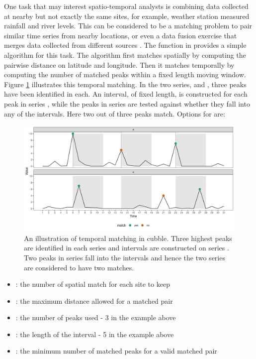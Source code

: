 \documentclass[
]{jss}
\providecommand{\tightlist}{%
  \setlength{\itemsep}{0pt}\setlength{\parskip}{0pt}}
\begin{document}
One task that may interest spatio-temporal analysts is combining data collected at nearby but not exactly the same sites, for example, weather station measured rainfall and river levels. This can be considered to be a matching problem \citep{stuart2010matching, mcintosh2018using} to pair similar time series from nearby locations, or even a data fusion exercise that merges data collected from different sources \citep{cocchi2019data}. The function  in  provides a simple algorithm for this task. The algorithm first matches spatially by computing the pairwise distance on latitude and longitude. Then it matches temporally by computing the number of matched peaks within a fixed length moving window. Figure \ref{fig:illu-matching} illustrates this temporal matching. In the two series,  and , three peaks have been identified in each. An interval, of fixed length, is constructed for each peak in series , while the peaks in series  are tested against whether they fall into any of the intervals. Here two out of three peaks match. Options for  are:

\begin{CodeChunk}
\begin{figure}

{\centering \includegraphics[width=1\linewidth]{../figures/illu-matching} 

}

\caption{An illustration of temporal matching in cubble. Three highest peaks are identified in each series and intervals are constructed on series . Two peaks in series  fall into the intervals and hence the two series are considered to have two matches.}\label{fig:illu-matching}
\end{figure}
\end{CodeChunk}

\begin{itemize}
\tightlist
\item
  : the number of spatial match for each site to keep
\item
  : the maximum distance allowed for a matched pair
\item
  : the number of peaks used - 3 in the example above
\item
  : the length of the interval - 5 in the example above
\item
  : the minimum number of matched peaks for a valid matched pair
\end{itemize}
\end{document}
